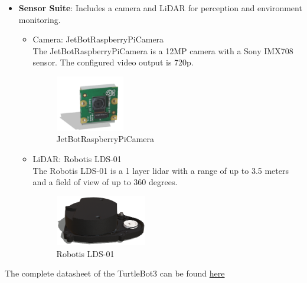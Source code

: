 \documentclass{article}
\begin{document}
\begin{itemize}
    \newpage
    \item \textbf{Sensor Suite}: Includes a camera and LiDAR for perception and environment monitoring.
    \begin{itemize}
        \item Camera: JetBotRaspberryPiCamera
        \\ The JetBotRaspberryPiCamera is a 12MP camera with a Sony IMX708 sensor. The configured video output is 720p.
            \begin{figure}[h]
                \centering
                \includegraphics[width=0.3\textwidth]{hardware_pictures/JetBotRaspberryPiCamera.png}
                \caption{JetBotRaspberryPiCamera}
                \label{fig:camera}
            \end{figure}
        \item LiDAR: Robotis LDS-01 
        \\The Robotis LDS-01 is a 1 layer lidar with a range of up to 3.5 meters and a field of view of up to 360 degrees.
        \begin{figure}[ht]
            \centering
            \includegraphics[width=0.4\textwidth]{hardware_pictures/RobotisLds01.png}
            \caption{Robotis LDS-01}
            \label{fig:lidar}
        \end{figure}
    \end{itemize}
\end{itemize}

The complete datasheet of the TurtleBot3 can be found \href{https://www.inf.ed.ac.uk/teaching/courses/sdp/SDP2020/turtlebot3_docs.pdf}{here}
\end{document}
